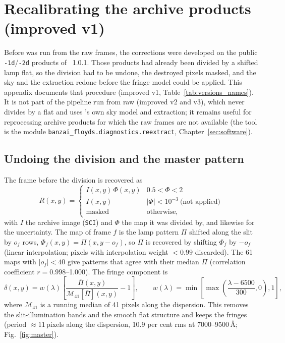 \chapter{Recalibrating the archive products (improved v1)}
\label{sec:app_v1}
Before \banzai{} was run from the raw frames, the corrections were developed on the public \texttt{-1d}/\texttt{-2d}
products of \banzai{}~1.0.1. Those products had already been divided by a shifted lamp flat, so the division had to
be undone, the destroyed pixels masked, and the sky and the extraction redone before the fringe model could be applied.
This appendix documents that procedure (improved v1, Table~\ref{tab:versions_names}). It is not part of the pipeline
run from raw (improved v2 and v3), which never divides by a flat and uses \banzai's own sky model and extraction; it
remains useful for reprocessing archive products for which the raw frames are not available (the tool is the module
\texttt{banzai\_floyds.diagnostics.reextract}, Chapter~\ref{sec:software}).

\section{Undoing the division and the master pattern}
\label{sec:fringe_master}
The frame before the division is recovered as
\begin{equation}
R(x,y)=\begin{cases} I(x,y)\,\Phi(x,y) & 0.5<\Phi<2\\ I(x,y) & |\Phi|<10^{-3}\ \text{(not applied)}\\
\text{masked} & \text{otherwise,}\end{cases}
\label{eq:undo}
\end{equation}
with $I$ the archive image (\texttt{SCI}) and $\Phi$ the map it was divided by, and likewise for the
uncertainty. The map of frame $f$ is the lamp pattern $\Pi$ shifted along the slit by $o_f$ rows,
$\Phi_f(x,y)=\Pi(x,y-o_f)$, so $\Pi$ is recovered by shifting $\Phi_f$ by $-o_f$ (linear interpolation; pixels with
interpolation weight $<0.99$ discarded). The 61 maps with $|o_f|<40$ give patterns that agree with their median
$\bar\Pi$ (correlation coefficient $r=0.998$--1.000). The fringe component is
\begin{equation}
\delta(x,y) = w(\lambda)\left[\frac{\bar\Pi(x,y)}{\mathcal{M}_{41}[\bar\Pi](x,y)}-1\right],\qquad
w(\lambda)=\min\!\left[\max\!\left(\frac{\lambda-6500}{300},0\right),1\right],
\label{eq:delta}
\end{equation}
where $\mathcal{M}_{41}$ is a running median of 41 pixels along the dispersion. This removes the slit-illumination
bands and the smooth flat structure and keeps the fringes (period $\approx11$\,pixels along the dispersion,
10.9 per cent rms at 7000--9500\,\AA; Fig.~\ref{fig:master}).

